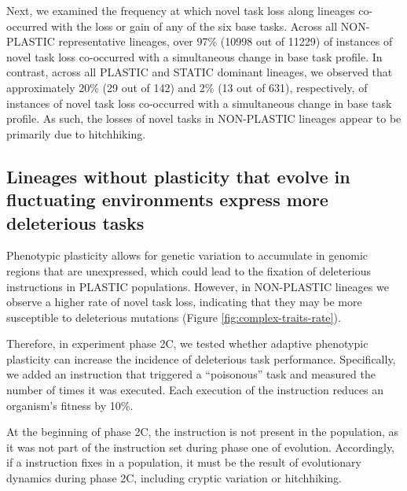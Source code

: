 Next, we examined the frequency at which novel task loss along lineages co-occurred with the loss or gain of any of the six base tasks.
Across all NON-PLASTIC representative lineages, over 97\% (10998 out of 11229) of instances of novel task loss co-occurred with a simultaneous change in base task profile.
In contrast, across all PLASTIC and STATIC dominant lineages, we observed that approximately 20\% (29 out of 142) and 2\% (13 out of 631), respectively, of instances of novel task loss co-occurred with a simultaneous change in base task profile.
As such, the losses of novel tasks in NON-PLASTIC lineages appear to be primarily due to hitchhiking.

\subsection{Lineages without plasticity that evolve in fluctuating environments express more deleterious tasks}


Phenotypic plasticity allows for genetic variation to accumulate in genomic regions that are unexpressed, which could lead to the fixation of deleterious instructions in PLASTIC populations.
However, in NON-PLASTIC lineages we observe a higher rate of novel task loss, indicating that they may be more susceptible to deleterious mutations (Figure \ref{fig:complex-traits-rate}).

Therefore, in experiment phase 2C, we tested whether adaptive phenotypic plasticity can increase the incidence of deleterious task performance. 
Specifically, we added an instruction that triggered a ``poisonous'' task and measured the number of times it was executed.
Each execution of the   instruction reduces an organism's fitness by 10\%. 

At the beginning of phase 2C, the  instruction is not present in the population, as it was not part of the instruction set during phase one of evolution.
Accordingly, if a  instruction fixes in a population, it must be the result of evolutionary dynamics during phase 2C, including cryptic variation or hitchhiking. 

